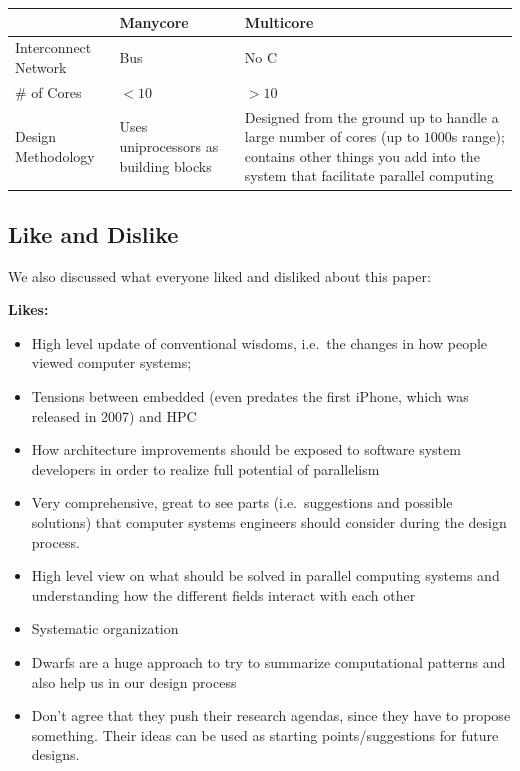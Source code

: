 \begin{center}
    \begin{tabular}{p{5cm} p{5cm} p{5cm}}
        \toprule
        & Manycore & Multicore \\
        \midrule
        Interconnect Network & Bus & No C \\
        \# of Cores & \( <10 \) & \( >10 \) \\
        Design Methodology & Uses uniprocessors as building blocks & Designed from the ground up to handle a large number of cores (up to \( 1000 \)s range); contains other things you add into the system that facilitate parallel computing \\
        \bottomrule
    \end{tabular}
\end{center}

\subsection{Like and Dislike}\label{feb-11:a-view:like-dislike}
We also discussed what everyone liked and disliked about this paper:

\textbf{Likes:}

\begin{itemize}
    \item High level update of conventional wisdoms, i.e.\ the changes in how people viewed computer systems;
    \item Tensions between embedded (even predates the first iPhone, which was released in 2007) and HPC
    \item How architecture improvements should be exposed to software system developers in order to realize full potential of parallelism
    \item Very comprehensive, great to see parts (i.e.\ suggestions and possible solutions) that computer systems engineers should consider during the design process.
    \item High level view on what should be solved in parallel computing systems and understanding how the different fields interact with each other
    \item Systematic organization
    \item Dwarfs are a huge approach to try to summarize computational patterns and also help us in our design process
    \item Don't agree that they push their research agendas, since they have to propose something.
    Their ideas can be used as starting points/suggestions for future designs.
\end{itemize}

